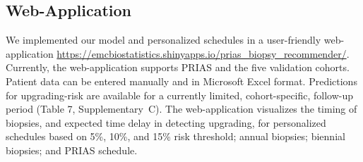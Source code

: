 \subsection{Web-Application}
We implemented our model and personalized schedules in a user-friendly web-application \url{https://emcbiostatistics.shinyapps.io/prias_biopsy_recommender/}. Currently, the web-application supports PRIAS and the five validation cohorts. Patient data can be entered manually and in Microsoft Excel format. Predictions for upgrading-risk are available for a currently limited, cohort-specific, follow-up period (Table 7, Supplementary~C). The web-application visualizes the timing of biopsies, and expected time delay in detecting upgrading, for personalized schedules based on 5\%, 10\%, and 15\% risk threshold; annual biopsies; biennial biopsies; and PRIAS schedule.